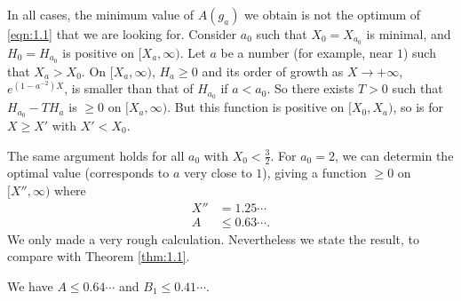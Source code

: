 In all cases, the minimum value of $A(g_a)$ we obtain is not the optimum of \eqref{eqn:1.1} that we are looking for.
Consider $a_0$ such that $X_0 = X_{a_0}$ is minimal, and $H_0 = H_{a_0}$ is positive on $[X_a, \infty)$.
Let $a$ be a number (for example, near $1$) such that $X_a > X_0$.
On $[X_a, \infty)$, $H_a \geq 0$ and its order of growth as $X \to +\infty$, $e^{(1-a^{-2})X}$, is smaller than that of $H_{a_0}$ if $a < a_0$.
So there exists $T > 0$ such that $H_{a_0} - TH_{a}$ is $\geq 0$ on $[X_a, \infty)$.
But this function is positive on $[X_0, X_a)$, so is for $X \geq X'$ with $X' < X_0$.

The same argument holds for all $a_0$ with $X_0 < \frac{3}{2}$.
For $a_0 = 2$, we can determin the optimal value (corresponds to $a$ very close to $1$), giving a function $\geq 0$ on $[X'', \infty)$ where
\begin{equation}
    \label{eqn:2.6}
    \begin{aligned}
        X'' &= 1.25 \cdots \\
        A &\leq 0.63\cdots.
    \end{aligned}
\end{equation}
We only made a very rough calculation.
Nevertheless we state the result, to compare with Theorem \ref{thm:1.1}.
\begin{theorem}
    \label{thm:2.1}
    We have $A \leq 0.64\cdots$ and $B_1 \leq 0.41\cdots$.
\end{theorem}
